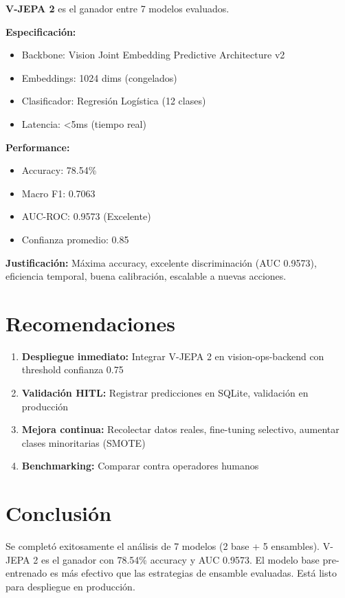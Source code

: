 \documentclass[11pt,letterpaper]{article}
\begin{document}
\textbf{V-JEPA 2} es el ganador entre 7 modelos evaluados.

\textbf{Especificación:}
\begin{itemize}
  \item Backbone: Vision Joint Embedding Predictive Architecture v2
  \item Embeddings: 1024 dims (congelados)
  \item Clasificador: Regresión Logística (12 clases)
  \item Latencia: <5ms (tiempo real)
\end{itemize}

\textbf{Performance:}
\begin{itemize}
  \item Accuracy: 78.54\%
  \item Macro F1: 0.7063
  \item AUC-ROC: 0.9573 (Excelente)
  \item Confianza promedio: 0.85
\end{itemize}

\textbf{Justificación:} Máxima accuracy, excelente discriminación (AUC 0.9573), eficiencia temporal, buena calibración, escalable a nuevas acciones.

\section{Recomendaciones}

\begin{enumerate}
  \item \textbf{Despliegue inmediato:} Integrar V-JEPA 2 en vision-ops-backend con threshold confianza 0.75
  \item \textbf{Validación HITL:} Registrar predicciones en SQLite, validación en producción
  \item \textbf{Mejora continua:} Recolectar datos reales, fine-tuning selectivo, aumentar clases minoritarias (SMOTE)
  \item \textbf{Benchmarking:} Comparar contra operadores humanos
\end{enumerate}

\section{Conclusión}

Se completó exitosamente el análisis de 7 modelos (2 base + 5 ensambles). V-JEPA 2 es el ganador con 78.54\% accuracy y AUC 0.9573. El modelo base pre-entrenado es más efectivo que las estrategias de ensamble evaluadas. Está listo para despliegue en producción.
\end{document}
